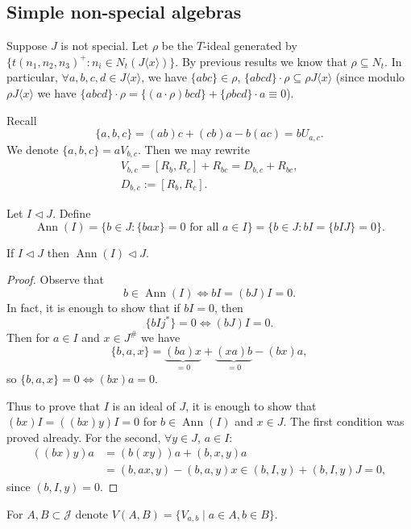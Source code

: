 \documentclass{article}
\begin{document}
\subsection*{Simple non-special algebras}
Suppose $J$ is not special. Let $\rho$ be the $T$-ideal generated by $\{t(n_1, n_2, n_3)^+ : n_i \in N_t(J\langle x \rangle)\}$. By previous results we know that $\rho \subseteq N_t$. In particular, $\forall a, b, c, d \in J\langle x \rangle$, we have $\{a b c\} \in \rho$, $\{a b c d\} \cdot \rho \subseteq \rho J\langle x \rangle$ (since modulo $\rho J\langle x \rangle$ we have $\{a b c d\} \cdot \rho = \{(a \cdot \rho) b c d\} + \{\rho b c d\} \cdot a \equiv 0$).

Recall
\[
\{a, b, c\} = (a b) c + (c b) a - b(a c) = b U_{a, c}.
\]
We denote $\{a, b, c\} = a V_{b, c}$. Then we may rewrite
\begin{gather*}
V_{b, c} = [R_b, R_c] + R_{b c} = D_{b, c} + R_{b c}, \\
D_{b, c} := [R_b, R_c].
\end{gather*}

Let $I \triangleleft J$. Define
\[
\operatorname{Ann}(I) = \{b \in J : \{b a x\} = 0 \text{ for all } a \in I \} = \{b \in J : b I = \{b I J\} = 0\}.
\]

\begin{lemma}
If $I \triangleleft J$ then $\operatorname{Ann}(I) \triangleleft J$.
\end{lemma}

\begin{proof}
Observe that
\[
b \in \operatorname{Ann}(I) \Leftrightarrow bI = (bJ)I = 0.
\]
In fact, it is enough to show that if $bI = 0$, then
\[
\{bIj^*\}=0 \Leftrightarrow (bJ)I = 0.
\]
Then for $a \in I$ and $x \in J^{\#}$ we have
\[
\{b,a,x\} = \underbrace{(ba)x}_{=0} + \underbrace{(xa)b}_{=0} - (bx)a,
\]
so $\{b,a,x\}=0 \Leftrightarrow (bx)a = 0$.

Thus to prove that $I$ is an ideal of $J$, it is enough to show that $(bx)I = ((bx)y)I = 0$ for $b \in \operatorname{Ann}(I)$ and $x \in J$. The first condition was proved already. For the second, $\forall y \in J$, $a \in I$:
\begin{align*}
((bx)y)a &= (b(xy))a + (b,x,y)a \\
&= (b,a x,y) - (b,a,y)x \in (b,I,y) + (b,I,y)J = 0,
\end{align*}
since $(b,I,y)=0$.
\end{proof}

For $A, B \subset \mathcal{J}$ denote $V(A,B) = \{ V_{a,b} \mid a \in A, b \in B \}$.
\end{document}
